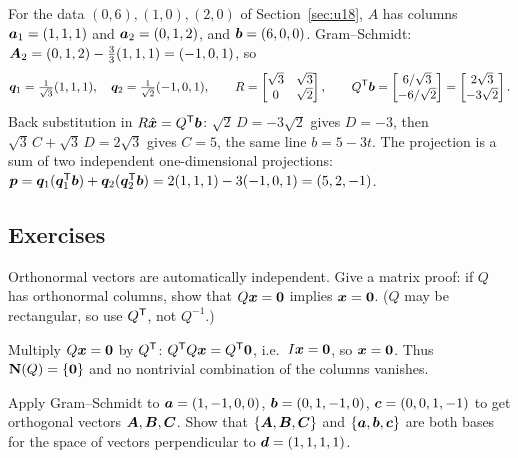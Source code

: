 \begin{example}\label{ex:u19-short}
For the data $(0,6),(1,0),(2,0)$ of Section~\ref{sec:u18}, $A$ has columns
$\boldsymbol{a}_1=(1,1,1)$ and $\boldsymbol{a}_2=(0,1,2)$, and $\boldsymbol{b}=(6,0,0)$. Gram--Schmidt:
$\boldsymbol{A}_2=(0,1,2)-\frac33(1,1,1)=(-1,0,1)$, so
\[
  \boldsymbol{q}_1=\tfrac{1}{\sqrt3}(1,1,1),\quad \boldsymbol{q}_2=\tfrac{1}{\sqrt2}(-1,0,1),\qquad
  R=\begin{bmatrix}\sqrt3&\sqrt3\\0&\sqrt2\end{bmatrix},\qquad
  Q^{\mathsf{T}}\boldsymbol{b}=\begin{bmatrix}6/\sqrt3\\-6/\sqrt2\end{bmatrix}=\begin{bmatrix}2\sqrt3\\-3\sqrt2\end{bmatrix}.
\]
Back substitution in $R\hat{\boldsymbol{x}}=Q^{\mathsf{T}}\boldsymbol{b}$: $\sqrt2\,D=-3\sqrt2$ gives $D=-3$, then
$\sqrt3\,C+\sqrt3\,D=2\sqrt3$ gives $C=5$, the same line $b=5-3t$. The projection is a sum of
two independent one-dimensional projections:
$\boldsymbol{p}=\boldsymbol{q}_1(\boldsymbol{q}_1^{\mathsf{T}}\boldsymbol{b})+\boldsymbol{q}_2(\boldsymbol{q}_2^{\mathsf{T}}\boldsymbol{b})=2(1,1,1)-3(-1,0,1)=(5,2,-1)$.
\end{example}

\subsection{Exercises}

\begin{exercise}\label{ex:u19-indep}
Orthonormal vectors are automatically independent. Give a matrix proof: if $Q$ has
orthonormal columns, show that $Q\boldsymbol{x}=\boldsymbol{0}$ implies $\boldsymbol{x}=\boldsymbol{0}$. ($Q$ may be
rectangular, so use $Q^{\mathsf{T}}$, not $Q^{-1}$.)
\end{exercise}

\begin{solution}
Multiply $Q\boldsymbol{x}=\boldsymbol{0}$ by $Q^{\mathsf{T}}$: $Q^{\mathsf{T}} Q\boldsymbol{x}=Q^{\mathsf{T}}\boldsymbol{0}$, i.e.\ $I\boldsymbol{x}=\boldsymbol{0}$, so
$\boldsymbol{x}=\boldsymbol{0}$. Thus $\mathbf{N}(Q)=\{\boldsymbol{0}\}$ and no nontrivial combination of the columns
vanishes.
\end{solution}

\begin{exercise}\label{ex:u19-perpd}
Apply Gram--Schmidt to $\boldsymbol{a}=(1,-1,0,0)$, $\boldsymbol{b}=(0,1,-1,0)$, $\boldsymbol{c}=(0,0,1,-1)$ to get
orthogonal vectors $\boldsymbol{A},\boldsymbol{B},\boldsymbol{C}$. Show that $\{\boldsymbol{A},\boldsymbol{B},\boldsymbol{C}\}$ and
$\{\boldsymbol{a},\boldsymbol{b},\boldsymbol{c}\}$ are both bases for the space of vectors perpendicular to
$\boldsymbol{d}=(1,1,1,1)$.
\end{exercise}


